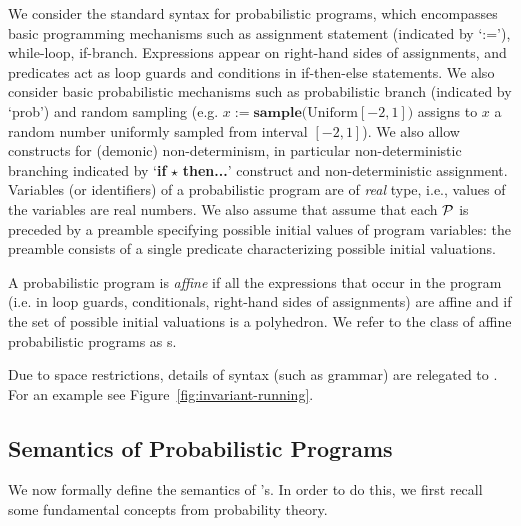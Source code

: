 We consider the standard syntax for probabilistic programs,
which encompasses basic programming mechanisms such as assignment statement 
(indicated by `:='), while-loop, if-branch. Expressions appear on right-hand sides of assignments, and predicates act as loop guards and conditions in if-then-else statements. We also consider basic probabilistic mechanisms 
such as probabilistic branch (indicated by `prob') and random sampling (e.g. 
$x:=\textbf{sample(}\mathrm{Uniform}[-2,1]\textbf{)}$ assigns to $x$ a random 
number 
uniformly sampled from interval $[-2,1]$). We also allow constructs for 
(demonic) non-determinism, in particular 
non-deterministic branching indicated by `\textbf{if }$\star$ \textbf{then...}' construct and non-deterministic assignment.  
Variables (or identifiers) of a probabilistic program are of \emph{real} type, i.e., 
values of the variables are real numbers. 
We also assume that assume that each \PP{} $\mathcal{P}$ is preceded by a preamble 
specifying possible initial values of program variables: the preamble consists 
of a single predicate characterizing possible initial valuations.

\smallskip{}
A probabilistic program is \emph{affine} if all the expressions that occur in 
the program (i.e. in loop guards, conditionals, right-hand sides of 
assignments) are affine and if the set of possible initial valuations is a 
polyhedron. We refer to the class of affine probabilistic programs 
as \APP s.

Due to space restrictions, details of syntax (such as grammar) are relegated to 
\AppendixMaterial.
For an example see Figure~\ref{fig:invariant-running}.




\vspace{-1em}
\subsection{Semantics of Probabilistic Programs}\label{subsec:semantics}
\vspace{-0.5em}

We now formally define the semantics of \PP's.
In order to do this, we first recall some fundamental concepts from probability
theory.


